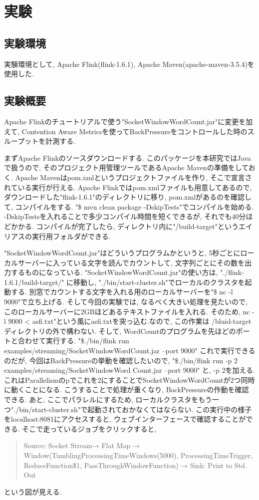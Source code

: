 \documentclass[11pt]{jreport}
\begin{document}
\chapter{実験}
\section{実験環境}
実験環境として, Apache Flink(flink-1.6.1), Apache Maven(apache-maven-3.5.4)を使用した. 


\section{実験概要}
Apache Flinkのチュートリアルで使う"SocketWindowWordCount.jar"に変更を加えて, 
Contention Aware Metrics\cite{cam}を使ってBackPressureをコントロールした時のスループットを計測する.

まずApache Flinkのソースダウンロードする. 
このパッケージを本研究ではJavaで扱うので, そのプロジェクト用管理ツールであるApache Mavenの準備をしておく.
Apache Mavenはpom.xmlというプロジェクトファイルを作り, そこで宣言されている実行が行える. 
Apache Flinkではpom.xmlファイルも用意してあるので, 
ダウンロードした"flink-1.6.1"のディレクトリに移り, pom.xmlがあるのを確認して, コンパイルをする.
 "\$ mvn clean package -DskipTests"でコンパイルを始める. 
-DskipTestsを入れることで多少コンパイル時間を短くできるが, それでも40分ほどかかる. 
コンパイルが完了したら, ディレクトリ内に"/build-target"というエイリアスの実行用フォルダができる. 

"SocketWindowWordCount.jar"はどういうプログラムかというと, 
5秒ごとにローカルサーバーに入っている文字を読んでカウントして, 
文字列ごとにその数を出力するものになっている.
"SocketWindowWordCount.jar"の使い方は, "./flink-1.6.1/build-target/" に移動し, 
"./bin/start-cluster.sh"でローカルのクラスタを起動する.
別窓でカウントする文字を入れる用のローカルサーバーを"\$ nc -l 9000"で立ち上げる. 
そして今回の実験では, なるべく大きい処理を見たいので, 
このローカルサーバーに2GBほどあるテキストファイルを入れる. 
そのため,  nc -l 9000 < asfi.txt"という風にasfi.txtを突っ込む.なので, この作業は
/bluid-targetディレクトリの外で構わない.
そして, WordCountのプログラムを先ほどのポートと合わせて実行する.  "\$./bin/flink run examples/streaming/SocketWindowWordCount.jar --port 9000"
これで実行できるのだが, 今回はBackPressureの挙動を確認したいので, "\$./bin/flink run -p 2 examples/streaming/SocketWindowWord
Count.jar --port 9000"
と, -p 2を加える. これはParallelismのpでこれを2にすることでSocketWindowWordCountが2つ同時に動くことになる.
こうすることで処理が重くなり, BackPressureの作動を確認できる. 
あと, ここでパラレルにするため, ローカルクラスタをもう一つ"./bin/start-cluster.sh"で起動されておかなくてはならない.
この実行中の様子をlocalhost:8081にアクセスすると, ウェブインターフェースで確認することができる. 
そこで走っているジョブをクリックすると, 
\begin{quote}
Source: Socket Stream→ Flat Map → Window(TumblingProcessingTimeWindows(5000), ProcessingTimeTrigger, ReduceFunction\$1, PassThroughWindowFunction) → Sink: Print to Std. Out
\end{quote}
という図が見える.  
\end{document}
